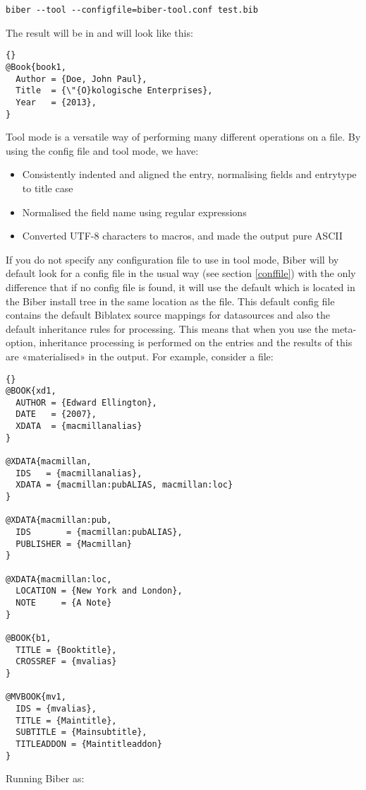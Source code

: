 \documentclass{ltxdockit}
\newcommand*{\biber}{Biber\xspace}
\newcommand*{\biblatex}{Biblatex\xspace}
\begin{document}
\begin{verbatim}
biber --tool --configfile=biber-tool.conf test.bib
\end{verbatim}
%
The result will be in  and will look like this:

\begin{lstlisting}[style=bibtex, columns=fixed]{}
@Book{book1,
  Author = {Doe, John Paul},
  Title  = {\"{O}kologische Enterprises},
  Year   = {2013},
}
\end{lstlisting}
%
Tool mode is a versatile way of performing many different operations
on a  file. By using the config file and tool mode, we
have:

\begin{itemize}
\item Consistently indented and aligned the entry, normalising fields and
  entrytype to title case
\item Normalised the  field name using regular expressions
\item Converted UTF-8 characters to \latex macros, and made the output
  pure ASCII
\end{itemize}

If you do not specify any configuration file to use in tool mode, \biber
will by default look for a config file in the usual way (see section
\ref{conffile}) with the only difference that if no config file is found,
it will use the default  which is located in the
\biber install tree in the same location as the  file. This
default config file contains the default \biblatex source mappings for
\bibtex datasources and also the default inheritance rules for
 processing. This means that when you use the
 meta-option, inheritance processing is performed on the
entries and the results of this are «materialised» in the output. For
example, consider a  file:

\begin{lstlisting}[style=bibtex, columns=fixed]{}
@BOOK{xd1,
  AUTHOR = {Edward Ellington},
  DATE   = {2007},
  XDATA  = {macmillanalias}
}

@XDATA{macmillan,
  IDS   = {macmillanalias},
  XDATA = {macmillan:pubALIAS, macmillan:loc}
}

@XDATA{macmillan:pub,
  IDS       = {macmillan:pubALIAS},
  PUBLISHER = {Macmillan}
}

@XDATA{macmillan:loc,
  LOCATION = {New York and London},
  NOTE     = {A Note} 
}

@BOOK{b1,
  TITLE = {Booktitle},
  CROSSREF = {mvalias}
}

@MVBOOK{mv1,
  IDS = {mvalias},
  TITLE = {Maintitle},
  SUBTITLE = {Mainsubtitle},
  TITLEADDON = {Maintitleaddon}
}
\end{lstlisting}
%
Running \biber as:
\end{document}

